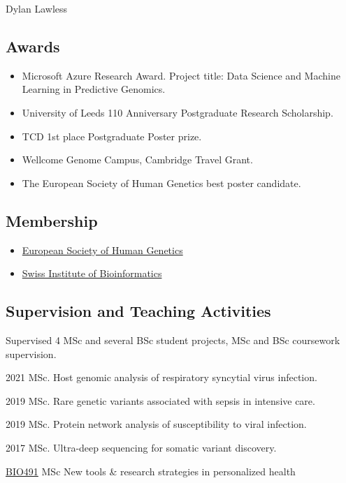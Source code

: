 \documentclass[12pt,a4paper]{article}
\begin{document}
\begin{cv}{Dylan Lawless}
\subsection*{Awards}
\begin{itemize}
\item Microsoft Azure Research Award. Project title: Data Science and Machine Learning in Predictive Genomics. 
\item University of Leeds 110 Anniversary Postgraduate Research Scholarship.
\item TCD 1st place Postgraduate Poster prize.
\item Wellcome Genome Campus, Cambridge Travel Grant.
\item The European Society of Human Genetics best poster candidate.
\end{itemize}


\subsection*{Membership}
\begin{itemize}
\item \href{https://www.eshg.org}{European Society of Human Genetics}
\item \href{https://www.sib.swiss}{Swiss Institute of Bioinformatics}
\end{itemize}

\subsection*{Supervision and Teaching Activities}
Supervised 4 MSc and several BSc student projects, MSc and BSc coursework supervision.
\begin{cvlist}{}
  \item [2021 MSc.  Host genomic analysis of respiratory syncytial virus infection.]
  \item [2019 MSc. Rare genetic variants associated with sepsis in intensive care.]
  \item [2019 MSc. Protein network analysis of susceptibility to viral infection.]
 \item [2017 MSc. Ultra-deep sequencing for somatic variant discovery.]

\item[\href{https://edu.epfl.ch/coursebook/en/new-tools-research-strategies-in-personalized-health-BIO-491?cb_cycle=bama_cyclemaster&cb_section=sv}{BIO491}] MSc New tools \& research strategies in personalized health


\end{cvlist}
\end{cv}
\end{document}
